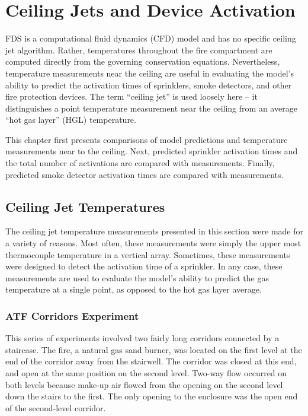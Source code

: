 
\chapter{Ceiling Jets and Device Activation}

FDS is a computational fluid dynamics (CFD) model and has no specific ceiling jet algorithm. Rather, temperatures throughout the fire compartment are computed directly from the governing conservation equations. Nevertheless, temperature measurements near the ceiling are useful in evaluating the model's ability to predict the activation times of sprinklers, smoke detectors, and other fire protection devices. The term ``ceiling jet'' is used loosely here -- it distinguishes a point temperature measurement near the ceiling from an average ``hot gas layer'' (HGL) temperature.

This chapter first presents comparisons of model predictions and temperature measurements near to the ceiling. Next, predicted sprinkler activation times and the total number of activations are compared with measurements. Finally, predicted smoke detector activation times are compared with measurements.

\section{Ceiling Jet Temperatures}

The ceiling jet temperature measurements presented in this section were made for a variety of reasons. Most often, these measurements were simply the upper most thermocouple temperature in a vertical array. Sometimes, these measurements were designed to detect the activation time of a sprinkler. In any case, these measurements are used to evaluate the model's ability to predict the gas temperature at a single point, as opposed to the hot gas layer average.

\clearpage

\subsection{ATF Corridors Experiment}

This series of experiments involved two fairly long corridors connected by a staircase. The fire, a natural gas sand burner, was located on the first level at the end of the corridor away from the stairwell. The corridor was closed at this end, and open at the same position on the
second level. Two-way flow occurred on both levels because make-up air flowed from the opening on the second level down
the stairs to the first. The only opening to the enclosure was the open end of the second-level corridor.


